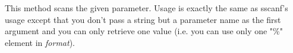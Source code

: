 
This method scans the given parameter. Usage is exactly the same as sscanf's 
usage except that you don't pass a string but a parameter name as the first
argument
and you can only retrieve one value (i.e. you can use only one "\%" element
in {\it format}).






